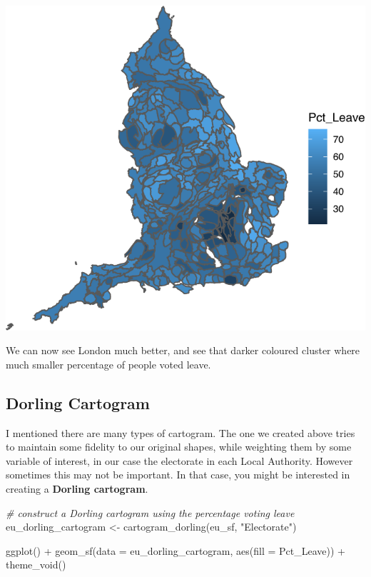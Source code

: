 \documentclass[
]{book}
\newenvironment{Shaded}{\begin{snugshade}}{\end{snugshade}}
\newcommand{\AttributeTok}[1]{\textcolor[rgb]{0.77,0.63,0.00}{#1}}
\newcommand{\CommentTok}[1]{\textcolor[rgb]{0.56,0.35,0.01}{\textit{#1}}}
\newcommand{\FunctionTok}[1]{\textcolor[rgb]{0.00,0.00,0.00}{#1}}
\newcommand{\NormalTok}[1]{#1}
\newcommand{\OtherTok}[1]{\textcolor[rgb]{0.56,0.35,0.01}{#1}}
\newcommand{\SpecialCharTok}[1]{\textcolor[rgb]{0.00,0.00,0.00}{#1}}
\newcommand{\StringTok}[1]{\textcolor[rgb]{0.31,0.60,0.02}{#1}}
\begin{document}
\includegraphics{crime_mapping_files/figure-latex/unnamed-chunk-137-1.pdf}

We can now see London much better, and see that darker coloured cluster where much smaller percentage of people voted leave.

\hypertarget{dorling-cartogram}{%
\subsection{Dorling Cartogram}\label{dorling-cartogram}}

I mentioned there are many types of cartogram. The one we created above tries to maintain some fidelity to our original shapes, while weighting them by some variable of interest, in our case the electorate in each Local Authority. However sometimes this may not be important. In that case, you might be interested in creating a \textbf{Dorling cartogram}.

\begin{Shaded}
\begin{Highlighting}[]
\CommentTok{\# construct a Dorling cartogram using the percentage voting leave}
\NormalTok{eu\_dorling\_cartogram }\OtherTok{\textless{}{-}} \FunctionTok{cartogram\_dorling}\NormalTok{(eu\_sf, }\StringTok{"Electorate"}\NormalTok{)}
\end{Highlighting}
\end{Shaded}

\begin{Shaded}
\begin{Highlighting}[]
\FunctionTok{ggplot}\NormalTok{() }\SpecialCharTok{+}
  \FunctionTok{geom\_sf}\NormalTok{(}\AttributeTok{data =}\NormalTok{ eu\_dorling\_cartogram, }\FunctionTok{aes}\NormalTok{(}\AttributeTok{fill =}\NormalTok{ Pct\_Leave)) }\SpecialCharTok{+} 
  \FunctionTok{theme\_void}\NormalTok{()}
\end{Highlighting}
\end{Shaded}
\end{document}
